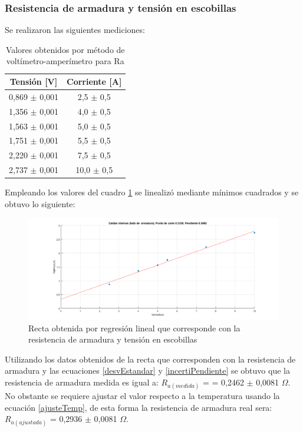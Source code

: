 \documentclass[11pt,letterpaper]{article}     %
\begin{document}
\subsubsection{Resistencia de armadura y tensión en escobillas}
Se realizaron las siguientes mediciones:
\begin{table}[H]
	\centering
	\caption{Valores obtenidos por método de voltímetro-amperímetro para Ra}
	\label{VoltimetroAmperimetroRA}
	\begin{tabular}{|c|c|}
		\hline
		\textbf{Tensión {[}V{]}} & \textbf{Corriente {[}A{]}} \\ \hline
		0,869 $\pm$ 0,001            & 2,5 $\pm$ 0,5            \\ \hline
		1,356 $\pm$ 0,001            & 4,0 $\pm$ 0,5            \\ \hline
		1,563 $\pm$ 0,001            & 5,0 $\pm$ 0,5            \\ \hline
		1,751 $\pm$ 0,001            & 5,5 $\pm$ 0,5            \\ \hline
		2,220 $\pm$ 0,001            & 7,5 $\pm$ 0,5             \\ \hline
		2,737 $\pm$ 0,001            & 10,0 $\pm$ 0,5             \\ \hline
	\end{tabular}
\end{table}
Empleando los valores del cuadro \ref{VoltimetroAmperimetroRA} se linealizó mediante mínimos cuadrados y se obtuvo lo siguiente:
\begin{figure}[H]
	\centering
	\includegraphics[scale=0.5]{./recursos-Lab6/caidasInternasARMADURA.png}
	\caption{Recta obtenida por regresión lineal que corresponde con la resistencia de armadura y tensión en escobillas}
	\label{fig:rectaResistenciaArmadura}
\end{figure}
Utilizando los datos obtenidos de la recta que corresponden con la resistencia de armadura y las ecuaciones \ref{desvEstandar} y \ref{incertiPendiente} se obtuvo que la resistencia de armadura medida es igual a: $R_{a(medida)}$ = = 0,2462 $\pm$ 0,0081 $\Omega$. No obstante se requiere ajustar el valor respecto a la temperatura usando la ecuación \ref{ajusteTemp}, de esta forma la resistencia de armadura real sera: $R_{a(ajustada)}$ = 0,2936 $\pm$ 0,0081 $\Omega$.
\end{document}
